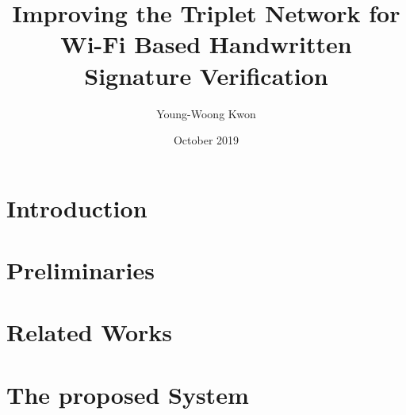 \documentclass[a4paper,11pt]{report}
\title{Improving the Triplet Network for Wi-Fi Based Handwritten Signature Verification}
\author{Young-Woong Kwon}
\date{October 2019}
\begin{document}
\makecover
\maketitle

\signaturepage

\pagestyle{plain}
\baselineskip 8.5mm
 \pagestyle{plain}
%
\setcounter{page}{0}
\tableofcontents
\listoffigures
{}
\listoftables
{}

\begin{abstract}

\end{abstract}

\chapter{Introduction}\label{chapter:Introduction}

%

\chapter{Preliminaries}\label{chapter:Preliminaries}


\chapter{Related Works}\label{chapter:Related Works}


%

\chapter{The proposed System}\label{chapter:The proposed System}

\end{document}
